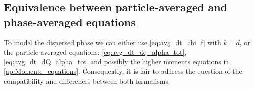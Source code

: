 
\subsection{Equivalence between particle-averaged and phase-averaged equations}
\label{sec:equivalence}
To model the dispersed phase we can either use \ref{eq:avg_dt_chi_f} with $k=d$, or the particle-averaged equations: \ref{eq:avg_dt_dq_alpha_tot}, \ref{eq:avg_dt_dQ_alpha_tot} and possibly the higher moments equations in \ref{ap:Moments_equations}. 
Consequently, it is fair to address the question of the compatibility and differences between both formalisms. 

